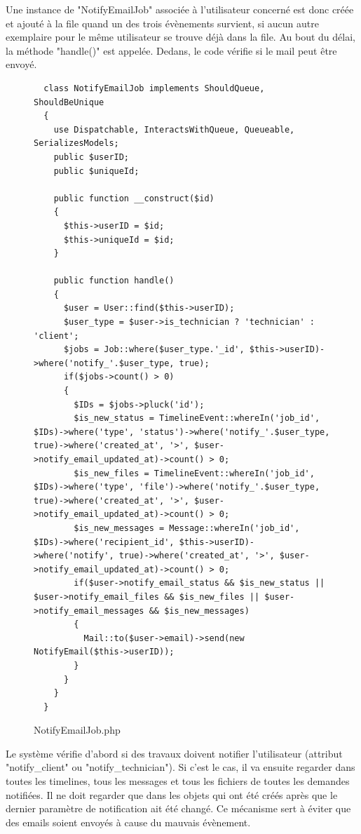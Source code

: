 \documentclass[
    iai, %
    eai, %
]{heig-tb}
\begin{document}
\newpage
Une instance de "NotifyEmailJob" associée à l'utilisateur concerné est donc créée et ajouté à la file quand un des trois évènements survient, si aucun autre exemplaire pour le même utilisateur se trouve déjà dans la file. Au bout du délai, la méthode "handle()" est appelée. Dedans, le code vérifie si le mail peut être envoyé.

\begin{figure}[h]
  \begin{verbatim}
  class NotifyEmailJob implements ShouldQueue, ShouldBeUnique
  {
    use Dispatchable, InteractsWithQueue, Queueable, SerializesModels;
    public $userID;
    public $uniqueId;

    public function __construct($id)
    {
      $this->userID = $id;
      $this->uniqueId = $id;
    }

    public function handle()
    {
      $user = User::find($this->userID);
      $user_type = $user->is_technician ? 'technician' : 'client';
      $jobs = Job::where($user_type.'_id', $this->userID)->where('notify_'.$user_type, true);
      if($jobs->count() > 0)
      {
        $IDs = $jobs->pluck('id');
        $is_new_status = TimelineEvent::whereIn('job_id', $IDs)->where('type', 'status')->where('notify_'.$user_type, true)->where('created_at', '>', $user->notify_email_updated_at)->count() > 0;
        $is_new_files = TimelineEvent::whereIn('job_id', $IDs)->where('type', 'file')->where('notify_'.$user_type, true)->where('created_at', '>', $user->notify_email_updated_at)->count() > 0;
        $is_new_messages = Message::whereIn('job_id', $IDs)->where('recipient_id', $this->userID)->where('notify', true)->where('created_at', '>', $user->notify_email_updated_at)->count() > 0;
        if($user->notify_email_status && $is_new_status || $user->notify_email_files && $is_new_files || $user->notify_email_messages && $is_new_messages)
        {
          Mail::to($user->email)->send(new NotifyEmail($this->userID));
        }
      }
    }
  }
  \end{verbatim}
  \caption{NotifyEmailJob.php}
\end{figure}

Le système vérifie d'abord si des travaux doivent notifier l'utilisateur (attribut "notify\_client" ou "notify\_technician"). Si c'est le cas, il va ensuite regarder dans toutes les timelines, tous les messages et tous les fichiers de toutes les demandes notifiées. Il ne doit regarder que dans les objets qui ont été créés après que le dernier paramètre de notification ait été changé.
Ce mécanisme sert à éviter que des emails soient envoyés à cause du mauvais évènement.
\end{document}

